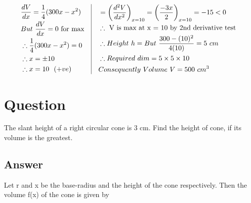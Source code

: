 \documentclass[17pt]{extarticle}
\begin{document}
\begin{fleqn}
\begin{equation} \nonumber
\begin{alignedat}{4}
& \frac{dV}{dx}=\frac{1}{4}(300x - x^2) \\
& But\  \frac{dV}{dx}= 0 \text{ for max}\\
& \therefore \frac{1}{4}(300x - x^2)=0\\
& \therefore x = \pm 10\\
& \therefore x = 10 \ \ (+ve)
\end{alignedat}
\quad
\vrule
\quad
\begin{alignedat}{4}
&= \left(\frac{d^2V}{dx^2}\right)_{x=10}=\left(\frac{-3x}{2}\right)_{x=10} = -15<0\\
& \therefore \text{ V is max at x = 10 by 2nd derivative test}\\
& \therefore Height\  h=But\  \frac{300 - (10)^2}{4(10)}= 5\ cm\\
& \therefore Required\  dim = 5 \times  5 \times 10 \\
& Consequently \ Volume\ V = 500 \ cm^3 \\
\end{alignedat}
\end{equation}



\section{Question}
The slant height of a right circular cone is 3 cm. Find the height of cone, if its volume is the greatest.


\subsection*{Answer}
Let  r  and x  be the base-radius and the height of the cone respectively. Then the volume f(x) of the cone is given by


\end{fleqn}
\end{document}
